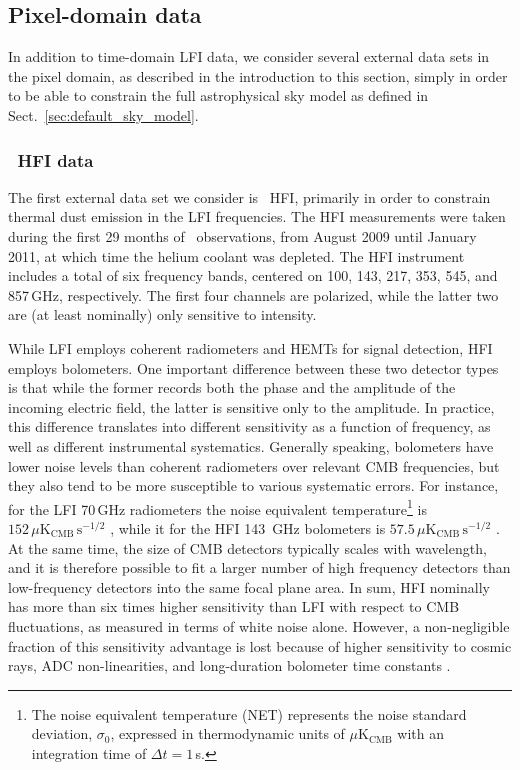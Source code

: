 \documentclass[onecolumn]{aa}
\begin{document}
\subsection{Pixel-domain data}

In addition to time-domain LFI data, we consider several external data
sets in the pixel domain, as described in the introduction to this
section, simply in order to be able to constrain the full
astrophysical sky model as defined in
Sect.~\ref{sec:default_sky_model}.

\subsubsection{\Planck\ HFI data}

The first external data set we consider is \Planck\ HFI, primarily in
order to constrain thermal dust emission in the LFI frequencies. The
HFI measurements were taken during the first 29 months of
\Planck\ observations, from August 2009 until January 2011, at which
time the helium coolant was depleted. The HFI instrument includes a
total of six frequency bands, centered on 100, 143, 217, 353, 545, and
857\,GHz, respectively. The first four channels are polarized, while
the latter two are (at least nominally) only sensitive to intensity.

While LFI employs coherent radiometers and HEMTs for signal detection,
HFI employs bolometers. One important difference between these two
detector types is that while the former records both the phase and the
amplitude of the incoming electric field, the latter is sensitive only
to the amplitude. In practice, this difference translates into
different sensitivity as a function of frequency, as well as different
instrumental systematics. Generally speaking, bolometers have lower
noise levels than coherent radiometers over relevant CMB frequencies,
but they also tend to be more susceptible to various systematic
errors. For instance, for the LFI 70\,GHz radiometers the noise
equivalent temperature\footnote{The noise equivalent temperature (NET)
  represents the noise standard deviation, $\sigma_0$, expressed in
  thermodynamic units of $\mu\mathrm{K}_{\mathrm{CMB}}$ with an
  integration time of $\Delta t=1$\,s.} is
$152\,\mu\mathrm{K}_{\mathrm{CMB}}\,\mathrm{s}^{-1/2}$
\citep{planck2014-a03}, while it for the HFI 143~GHz bolometers is
$57.5\,\mu\mathrm{K}_{\mathrm{CMB}}\,\mathrm{s}^{-1/2}$
\citep{planck2014-a08}. At the same time, the size of CMB detectors
typically scales with wavelength, and it is therefore possible to fit
a larger number of high frequency detectors than low-frequency
detectors into the same focal plane area. In sum, HFI nominally has
more than six times higher sensitivity than LFI with respect to CMB
fluctuations, as measured in terms of white noise alone. However, a
non-negligible fraction of this sensitivity advantage is lost because
of higher sensitivity to cosmic rays, ADC non-linearities, and
long-duration bolometer time constants \citep{planck2016-l03}.
\end{document}
